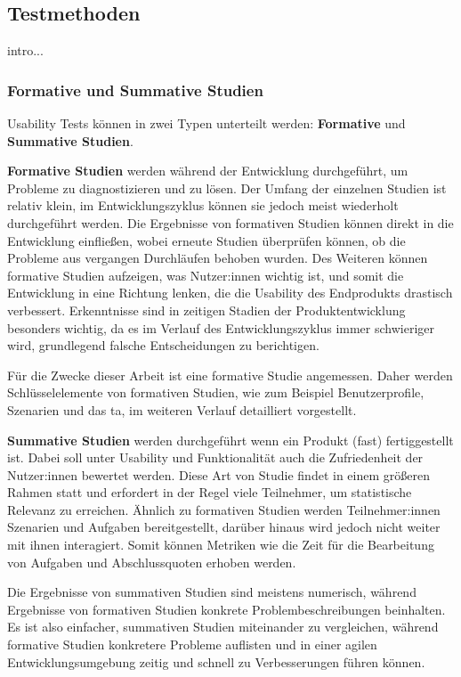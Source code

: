 
\subsection{Testmethoden}
intro...
\subsubsection{Formative und Summative Studien}
\label{section:formative-summative}
Usability Tests können in zwei Typen unterteilt werden: \textbf{Formative} und \textbf{Summative
Studien}.

\textbf{Formative Studien} werden während der Entwicklung durchgeführt, um Probleme zu
diagnostizieren und zu lösen. Der Umfang der einzelnen Studien ist relativ klein, im
Entwicklungszyklus können sie jedoch meist wiederholt durchgeführt werden. Die Ergebnisse von
formativen Studien können direkt in die Entwicklung einfließen, wobei erneute Studien überprüfen
können, ob die Probleme aus vergangen Durchläufen behoben wurden. Des Weiteren können formative
Studien aufzeigen, was Nutzer:innen wichtig ist, und somit die Entwicklung in eine Richtung lenken,
die die Usability des Endprodukts drastisch verbessert. Erkenntnisse sind in zeitigen Stadien der
Produktentwicklung besonders wichtig, da es im Verlauf des Entwicklungszyklus immer schwieriger
wird, grundlegend falsche Entscheidungen zu berichtigen.

Für die Zwecke dieser Arbeit ist eine formative Studie angemessen. Daher werden Schlüsselelemente
von formativen Studien, wie zum Beispiel Benutzerprofile, Szenarien und das \acl{ta}, im weiteren
Verlauf detailliert vorgestellt.

\textbf{Summative Studien} werden durchgeführt wenn ein Produkt (fast) fertiggestellt ist. Dabei
soll unter Usability und Funktionalität auch die Zufriedenheit der Nutzer:innen bewertet werden.
Diese Art von Studie findet in einem größeren Rahmen statt und erfordert in der Regel viele
Teilnehmer, um statistische Relevanz zu erreichen. Ähnlich zu formativen Studien werden
Teilnehmer:innen Szenarien und Aufgaben bereitgestellt, darüber hinaus wird jedoch nicht weiter mit
ihnen interagiert. Somit können Metriken wie die Zeit für die Bearbeitung von Aufgaben und
Abschlussquoten erhoben werden.

Die Ergebnisse von summativen Studien sind meistens numerisch, während Ergebnisse von formativen
Studien konkrete Problembeschreibungen beinhalten. Es ist also einfacher, summativen Studien
miteinander zu vergleichen, während formative Studien konkretere Probleme auflisten und in einer
agilen Entwicklungsumgebung zeitig und schnell zu Verbesserungen führen können.

